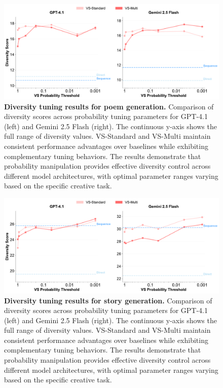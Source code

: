 \begin{figure}
    \centering
    \includegraphics[width=\linewidth]{figures/appendix/diversity_tuning/poem_diversity_tuning_comparison.pdf}
    \caption{
    \textbf{Diversity tuning results for poem generation.}
    Comparison of diversity scores across probability
  tuning parameters for GPT-4.1 (left) and Gemini 2.5 Flash
  (right). The continuous y-axis shows the full range of
  diversity values. VS-Standard and VS-Multi maintain consistent
  performance advantages over baselines while exhibiting
  complementary tuning behaviors. The results demonstrate that
  probability manipulation provides effective diversity control
  across different model architectures, with optimal parameter
  ranges varying based on the specific creative task.
    }
    \label{fig:diversity_tuning_poem}
\end{figure}

\begin{figure}
    \centering
    \includegraphics[width=\linewidth]{figures/appendix/diversity_tuning/book_diversity_tuning_comparison.pdf}
    \caption{
    \textbf{Diversity tuning results for story generation.}
    Comparison of diversity scores across probability
  tuning parameters for GPT-4.1 (left) and Gemini 2.5 Flash
  (right). The continuous y-axis shows the full range of
  diversity values. VS-Standard and VS-Multi maintain consistent
  performance advantages over baselines while exhibiting
  complementary tuning behaviors. The results demonstrate that
  probability manipulation provides effective diversity control
  across different model architectures, with optimal parameter
  ranges varying based on the specific creative task.
    }
    \label{fig:diversity_tuning_story}
\end{figure}


